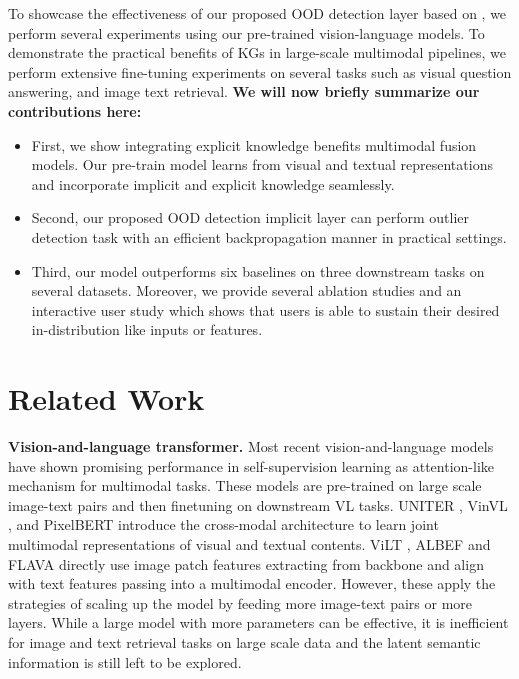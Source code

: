 \documentclass{article}
\begin{document}
To showcase the effectiveness of our proposed OOD detection layer based on , we perform several experiments using our pre-trained vision-language models. To demonstrate the practical benefits of KGs in large-scale multimodal pipelines, we perform extensive fine-tuning experiments on several tasks such as visual question answering, and image text retrieval. {\bf We will now briefly summarize our contributions here:}

\begin{itemize}
\item First, we show integrating explicit knowledge benefits multimodal fusion models. Our pre-train model learns from visual and textual representations and incorporate implicit and explicit knowledge seamlessly.

\item Second, our proposed OOD detection implicit layer can perform outlier detection task with an efficient backpropagation manner in practical settings.


\item  Third, our model outperforms six baselines on three downstream tasks on several datasets. Moreover, we provide several ablation studies and an interactive user study which shows that users is able to sustain their desired in-distribution like inputs or features. 





\end{itemize}






















\section{Related Work}
\textbf{Vision-and-language transformer.} Most recent vision-and-language models have shown promising performance in self-supervision learning as attention-like mechanism for multimodal tasks. These models are pre-trained on large scale image-text pairs and then finetuning on downstream VL tasks. UNITER  \cite{chen2020uniter}, VinVL \cite{zhang2021vinvl}, and PixelBERT \cite{huang2020pixel} introduce the cross-modal architecture to learn joint multimodal representations of visual and textual contents. ViLT \cite{kim2021vilt}, ALBEF \cite{li2021align} and FLAVA \cite{singh2022flava} directly use image patch features extracting from backbone and align with text features passing into a multimodal encoder. However, these apply the strategies of scaling up the model by feeding more image-text pairs or more layers. While a large model with more parameters can be effective, it is inefficient for image and text retrieval tasks on large scale data and the latent semantic information is still left to be explored.   
\end{document}
